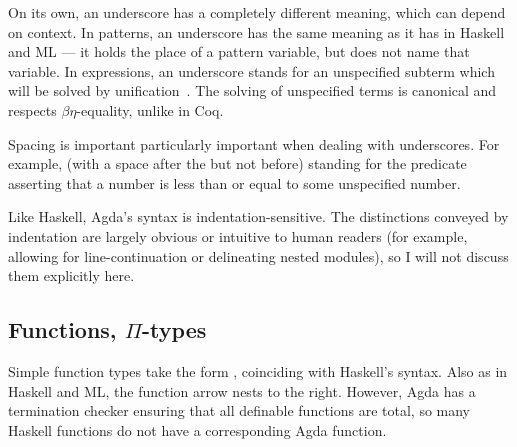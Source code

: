 On its own, an underscore has a completely different meaning, which can depend
on context.
In patterns, an underscore has the same meaning as it has in Haskell and ML ---
it holds the place of a pattern variable, but does not name that variable.
In expressions, an underscore stands for an unspecified subterm which will be
solved by unification~\citep{AP11,Miller92}.
The solving of unspecified terms is canonical and respects $\beta\eta$-equality,
unlike in Coq.

Spacing is important particularly important when dealing with underscores.
For example,
\AgdaDatatype{\_$\leq$}\AgdaSpace{}\AgdaSymbol{\_} (with a space after the
\AgdaDatatype{$\leq$} but not before) standing for the predicate asserting that
a number is less than or equal to some unspecified number.

Like Haskell, Agda's syntax is indentation-sensitive.
The distinctions conveyed by indentation are largely obvious or intuitive to
human readers (for example, allowing for line-continuation or delineating nested
modules), so I will not discuss them explicitly here.

\subsection{Functions, $\Pi$-types}\label{sec:pi-types}

Simple function types take the form
\AgdaSpace{}\AgdaSymbol{$\to$}\AgdaSpace{},
coinciding with Haskell's syntax.
Also as in Haskell and ML, the function arrow nests to the right.
However, Agda has a termination checker ensuring that all definable functions
are total, so many Haskell functions do not have a corresponding Agda function.

